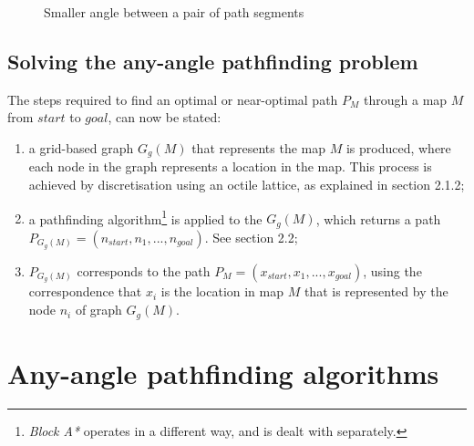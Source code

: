 \documentclass[12pt,notitlepage]{report}
\begin{document}
\begin{figure}
   \centering
    \caption{Smaller angle between a pair of path segments}
  \end{figure}


\subsection{Solving the any-angle pathfinding problem}

\noindent
The steps required to find an optimal or near-optimal path $P_{M}$ through a map $M$ from $start$ to $goal$, can now be stated:
\begin{enumerate}
\item a grid-based graph $G_{g}(M)$ that represents the map $M$ is produced, where each node in the graph represents a location in the map. This process is achieved by discretisation using an octile lattice, as explained in section 2.1.2;
\item a pathfinding algorithm\footnote{{\em Block A*} operates in a different way, and is dealt with separately.} is applied to the $G_{g}(M)$, which returns a path $P_{G_{g}(M)} = (n_{start},n_{1},...,n_{goal})$. See section 2.2;
\item $P_{G_{g}(M)}$ corresponds to the path $P_{M} = (x_{start},x_{1},...,x_{goal})$, using the correspondence that $x_{i}$ is the location in map $M$ that is represented by the node $n_{i}$ of graph $G_{g}(M)$.
\end{enumerate}

\section{Any-angle pathfinding algorithms}
\end{document}
